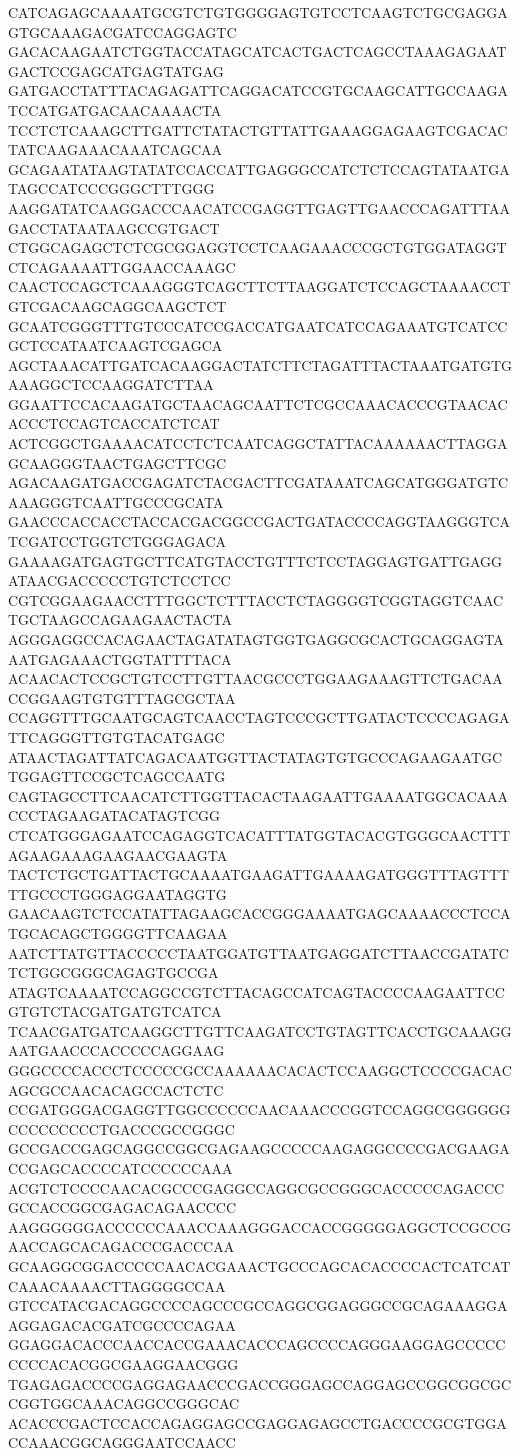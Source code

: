 CATCAGAGCAAAATGCGTCTGTGGGGAGTGTCCTCAAGTCTGCGAGGAGTGCAAAGACGATCCAGGAGTC
GACACAAGAATCTGGTACCATAGCATCACTGACTCAGCCTAAAGAGAATGACTCCGAGCATGAGTATGAG
GATGACCTATTTACAGAGATTCAGGACATCCGTGCAAGCATTGCCAAGATCCATGATGACAACAAAACTA
TCCTCTCAAAGCTTGATTCTATACTGTTATTGAAAGGAGAAGTCGACACTATCAAGAAACAAATCAGCAA
GCAGAATATAAGTATATCCACCATTGAGGGCCATCTCTCCAGTATAATGATAGCCATCCCGGGCTTTGGG
AAGGATATCAAGGACCCAACATCCGAGGTTGAGTTGAACCCAGATTTAAGACCTATAATAAGCCGTGACT
CTGGCAGAGCTCTCGCGGAGGTCCTCAAGAAACCCGCTGTGGATAGGTCTCAGAAAATTGGAACCAAAGC
CAACTCCAGCTCAAAGGGTCAGCTTCTTAAGGATCTCCAGCTAAAACCTGTCGACAAGCAGGCAAGCTCT
GCAATCGGGTTTGTCCCATCCGACCATGAATCATCCAGAAATGTCATCCGCTCCATAATCAAGTCGAGCA
AGCTAAACATTGATCACAAGGACTATCTTCTAGATTTACTAAATGATGTGAAAGGCTCCAAGGATCTTAA
GGAATTCCACAAGATGCTAACAGCAATTCTCGCCAAACACCCGTAACACACCCTCCAGTCACCATCTCAT
ACTCGGCTGAAAACATCCTCTCAATCAGGCTATTACAAAAAACTTAGGAGCAAGGGTAACTGAGCTTCGC
AGACAAGATGACCGAGATCTACGACTTCGATAAATCAGCATGGGATGTCAAAGGGTCAATTGCCCGCATA
GAACCCACCACCTACCACGACGGCCGACTGATACCCCAGGTAAGGGTCATCGATCCTGGTCTGGGAGACA
GAAAAGATGAGTGCTTCATGTACCTGTTTCTCCTAGGAGTGATTGAGGATAACGACCCCCTGTCTCCTCC
CGTCGGAAGAACCTTTGGCTCTTTACCTCTAGGGGTCGGTAGGTCAACTGCTAAGCCAGAAGAACTACTA
AGGGAGGCCACAGAACTAGATATAGTGGTGAGGCGCACTGCAGGAGTAAATGAGAAACTGGTATTTTACA
ACAACACTCCGCTGTCCTTGTTAACGCCCTGGAAGAAAGTTCTGACAACCGGAAGTGTGTTTAGCGCTAA
CCAGGTTTGCAATGCAGTCAACCTAGTCCCGCTTGATACTCCCCAGAGATTCAGGGTTGTGTACATGAGC
ATAACTAGATTATCAGACAATGGTTACTATAGTGTGCCCAGAAGAATGCTGGAGTTCCGCTCAGCCAATG
CAGTAGCCTTCAACATCTTGGTTACACTAAGAATTGAAAATGGCACAAACCCTAGAAGATACATAGTCGG
CTCATGGGAGAATCCAGAGGTCACATTTATGGTACACGTGGGCAACTTTAGAAGAAAGAAGAACGAAGTA
TACTCTGCTGATTACTGCAAAATGAAGATTGAAAAGATGGGTTTAGTTTTTGCCCTGGGAGGAATAGGTG
GAACAAGTCTCCATATTAGAAGCACCGGGAAAATGAGCAAAACCCTCCATGCACAGCTGGGGTTCAAGAA
AATCTTATGTTACCCCCTAATGGATGTTAATGAGGATCTTAACCGATATCTCTGGCGGGCAGAGTGCCGA
ATAGTCAAAATCCAGGCCGTCTTACAGCCATCAGTACCCCAAGAATTCCGTGTCTACGATGATGTCATCA
TCAACGATGATCAAGGCTTGTTCAAGATCCTGTAGTTCACCTGCAAAGGAATGAACCCACCCCCAGGAAG
GGGCCCCACCCTCCCCCGCCAAAAAACACACTCCAAGGCTCCCCGACACAGCGCCAACACAGCCACTCTC
CCGATGGGACGAGGTTGGCCCCCCAACAAACCCGGTCCAGGCGGGGGGCCCCCCCCCTGACCCGCCGGGC
GCCGACCGAGCAGGCCGGCGAGAAGCCCCCAAGAGGCCCCGACGAAGACCGAGCACCCCATCCCCCCAAA
ACGTCTCCCCAACACGCCCGAGGCCAGGCGCCGGGCACCCCCAGACCCGCCACCGGCGAGACAGAACCCC
AAGGGGGGACCCCCCAAACCAAAGGGACCACCGGGGGAGGCTCCGCCGAACCAGCACAGACCCGACCCAA
GCAAGGCGGACCCCCAACACGAAACTGCCCAGCACACCCCACTCATCATCAAACAAAACTTAGGGGCCAA
GTCCATACGACAGGCCCCAGCCCGCCAGGCGGAGGGCCGCAGAAAGGAAGGAGACACGATCGCCCCAGAA
GGAGGACACCCAACCACCGAAACACCCAGCCCCAGGGAAGGAGCCCCCCCCCACACGGCGAAGGAACGGG
TGAGAGACCCCGAGGAGAACCCGACCGGGAGCCAGGAGCCGGCGGCGCCGGTGGCAAACAGGCCGGGCAC
ACACCCGACTCCACCAGAGGAGCCGAGGAGAGCCTGACCCCGCGTGGACCAAACGGCAGGGAATCCAACC
